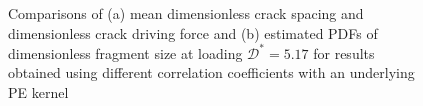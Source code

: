 \begin{figure}[htb!]
\begin{subfigure}[b]{0.475\textwidth}
    \caption{}
  \end{subfigure}
  \caption[Fragment statistics for different correlation coefficients with a PE kernel.]{Comparisons of (a) mean dimensionless crack spacing and dimensionless crack driving force and (b) estimated PDFs of dimensionless fragment size at loading $\mathcal{D}^* = 5.17$ for results obtained using different correlation coefficients with an underlying PE kernel}
  \label{fig: Chapter4/2D/statistics_sensitivity_exp}
\end{figure}
